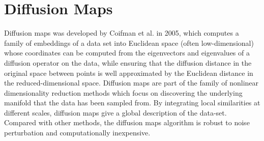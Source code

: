 \section{Diffusion Maps\label{Sec:DR:DM}}
Diffusion maps was developed by Coifman et al. in 2005\cite{CoifmanPNAS2005a,CoifmanPNAS2005b,CoifmanACHA2006}, which computes a family of embeddings of a data set into Euclidean space (often low-dimensional) whose coordinates can be computed from the eigenvectors and eigenvalues of a diffusion operator on the data, while ensuring that the diffusion distance in the original space between points is well approximated by the Euclidean distance in the reduced-dimensional space. Diffusion maps are part of the family of nonlinear dimensionality reduction methods which focus on discovering the underlying manifold that the data has been sampled from. By integrating local similarities at different scales, diffusion maps give a global description of the data-set. Compared with other methods, the diffusion maps algorithm is robust to noise perturbation and computationally inexpensive.


